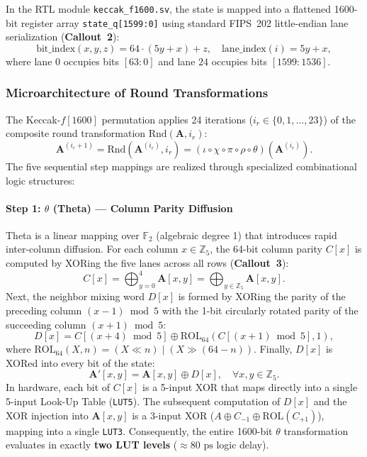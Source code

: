 In the RTL module \texttt{keccak\_f1600.sv}, the state is mapped into a flattened 1600-bit register array \texttt{state\_q[1599:0]} using standard FIPS~202 little-endian lane serialization (\textbf{Callout~2}):
\begin{equation}
\text{bit\_index}(x, y, z) = 64 \cdot (5y + x) + z, \quad \text{lane\_index}(i) = 5y + x,
\label{eq:state_indexing}
\end{equation}
where lane $0$ occupies bits $[63:0]$ and lane $24$ occupies bits $[1599:1536]$.

\subsubsection{Microarchitecture of Round Transformations}
The Keccak-$f[1600]$ permutation applies 24 iterations ($i_r \in \{0, 1, \dots, 23\}$) of the composite round transformation $\text{Rnd}(\mathbf{A}, i_r)$:
\begin{equation}
\mathbf{A}^{(i_r+1)} = \text{Rnd}(\mathbf{A}^{(i_r)}, i_r) = (\iota \circ \chi \circ \pi \circ \rho \circ \theta)(\mathbf{A}^{(i_r)}).
\label{eq:keccak_round_composition}
\end{equation}
The five sequential step mappings are realized through specialized combinational logic structures:

\paragraph{Step 1: $\theta$ (Theta) --- Column Parity Diffusion}
Theta is a linear mapping over $\mathbb{F}_2$ (algebraic degree 1) that introduces rapid inter-column diffusion. For each column $x \in \mathbb{Z}_5$, the 64-bit column parity $C[x]$ is computed by XORing the five lanes across all rows (\textbf{Callout~3}):
\begin{equation}
C[x] = \bigoplus_{y=0}^4 \mathbf{A}[x, y] = \bigoplus_{y \in \mathbb{Z}_5} \mathbf{A}[x, y].
\label{eq:theta_c}
\end{equation}
Next, the neighbor mixing word $D[x]$ is formed by XORing the parity of the preceding column $(x-1) \bmod 5$ with the 1-bit circularly rotated parity of the succeeding column $(x+1) \bmod 5$:
\begin{equation}
D[x] = C[(x+4) \bmod 5] \oplus \text{ROL}_{64}(C[(x+1) \bmod 5], 1),
\label{eq:theta_d}
\end{equation}
where $\text{ROL}_{64}(X, n) = (X \ll n) \mid (X \gg (64 - n))$. Finally, $D[x]$ is XORed into every bit of the state:
\begin{equation}
\mathbf{A}'[x, y] = \mathbf{A}[x, y] \oplus D[x], \quad \forall x, y \in \mathbb{Z}_5.
\label{eq:theta_out}
\end{equation}
In hardware, each bit of $C[x]$ is a 5-input XOR that maps directly into a single 5-input Look-Up Table (\texttt{LUT5}). The subsequent computation of $D[x]$ and the XOR injection into $\mathbf{A}[x, y]$ is a 3-input XOR ($A \oplus C_{-1} \oplus \text{ROL}(C_{+1})$), mapping into a single \texttt{LUT3}. Consequently, the entire 1600-bit $\theta$ transformation evaluates in exactly \textbf{two LUT levels} ($\approx 80\text{ ps}$ logic delay).

